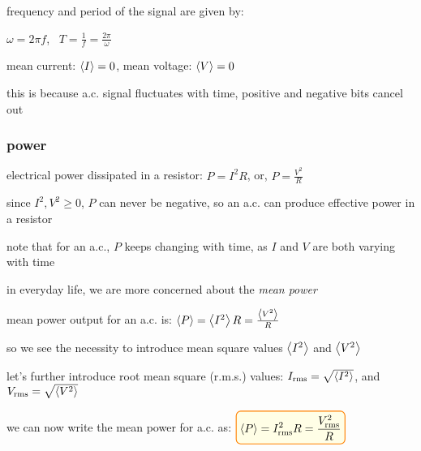 frequency and period of the signal are given by:

{

\centering

$\boxed{\omega = 2 \pi f}$, $\,$ $\boxed{T = \frac{1}{f} = \frac{2\pi}{\omega}} $

}

\cmt mean current: $\left< I \right> = 0$, mean voltage: $\left< V \right>=0$

this is because a.c. signal fluctuates with time, positive and negative bits cancel out

\newpage







\subsubsection{power}

electrical power dissipated in a resistor: $P = I^2 R$, or, $P=\frac{V^2}{R}$

since $I^2, V^2 \geq 0$, $P$ can never be negative, so an a.c. can produce effective power in a resistor

note that for an a.c., $P$ keeps changing with time, as $I$ and $V$ are both varying with time

in everyday life, we are more concerned about the \emph{mean power}

mean power output for an a.c. is: $\left< P \right> = \left< I^2 \right> R = \frac{\left< V^2 \right>}{R}$

so we see the necessity to introduce mean square values $\left< I^2 \right>$  and $\left< V^2 \right>$

let's further introduce root mean square (r.m.s.) values: $I_\text{rms} = \sqrt{\left< I^2 \right>}$, and $V_\text{rms} = \sqrt{\left< V^2 \right>}$

we can now write the mean power for a.c. as: $\boxed{\avg{P} = I^2_\text{rms} R = \frac{V^2_\text{rms}}{R}}$

